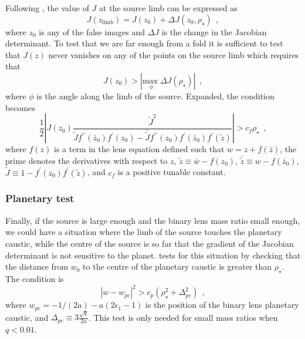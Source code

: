 \documentclass[12pt,dvipsnames]{report}
\newcommand{\hquad}{~~}
\begin{document}
Following \citet{2018MNRAS.479.5157B}, the value of $J$ at the source limb can be 
expressed as 
\begin{equation}
    J(z_\mathrm{limb})=J(z_0)+\Delta J(z_0,\rho_\star)
    \hquad,
\end{equation}
where $z_0$ is any of the false images and $\Delta J$ is the change in the Jacobian 
determinant.
To test that we are far enough from a fold it is sufficient to test that $J(z)$ never 
vanishes on any of the points on the source limb which requires that 
\citep[see][]{2018MNRAS.479.5157B}
\begin{equation}
    J(z_0)>|\underset{\phi}{\mathrm{max}\;}\Delta J(\rho_\star)|
    \hquad,
\end{equation}
where $\phi$ is the angle along the limb of the source.
Expanded, the condition becomes
\begin{equation}
\frac{1}{2}\left| J\left(z_0\right) \frac{\tilde{J}^{2}}{\tilde{J} 
f^{\prime \prime}\left(\bar{z}_0\right) f^{\prime}\left(z_0\right)-\bar{\tilde{J}} 
f^{\prime \prime}\left(z_0\right) f^{\prime}\left(\bar{z}_0\right) f^{\prime}
(\tilde{z})}\right|>c_f \rho_\star
\hquad,
\end{equation}
where $f(z)$ is a term in the lens equation defined such that $w=z + f(\bar{z})$, the prime
 denotes the  derivatives with respect to $z$, $\tilde{z}\equiv \bar{w}-f(z_0)$, 
$\bar{\tilde{z}}\equiv w - f(\bar{z}_0)$, $\tilde{J}\equiv 1 - f^\prime(z_0)f^\prime(\tilde{z})$,
and $c_f$ is a positive tunable constant.

\subsubsection{Planetary test}
Finally, if the source is large enough and the binary lens mass ratio small enough, we 
could have a situation where the limb of the source touches the planetary caustic, while 
the centre of the source is so far that the gradient of the Jacobian determinant is not 
sensitive to the planet. \citet{2018MNRAS.479.5157B} tests for this situation by checking 
that the distance from $w_0$ to the centre of the planetary caustic is greater than $\rho_\star$. 
The condition is
\begin{equation}
\left|w-w_{p c}\right|^{2}>c_p\left(\rho_\star^{2}+\Delta_{p c}^{2}\right)
\hquad ,
\end{equation}
where $w_{pc}=-1/(2a)-a(2\epsilon_1 - 1)$ is the position of the binary lens planetary 
caustic, and $\Delta_{pc}\equiv 3\frac{\sqrt{q}}{2a}$. This test is only needed for small 
mass ratios when $q<0.01$. 
\end{document}

